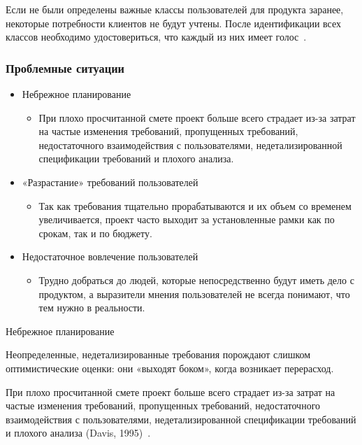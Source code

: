 \documentclass{../industrial-development}
\begin{document}
{Если не были определены важные классы пользователей для продукта заранее, некоторые потребности клиентов не будут учтены.
После идентификации всех классов необходимо удостовериться, что каждый из них имеет голос~\cite[с.~19]{Wiegers}.


\begin{frame} \frametitle {Проблемные ситуации}
\begin{itemize}

\item \alert{Небрежное планирование} 
\begin{itemize}
\item При плохо просчитанной смете проект больше всего страдает из-за затрат на частые изменения требований, пропущенных требований, недостаточного взаимодействия с пользователями, недетализированной спецификации требований и плохого
анализа.
\end{itemize}

\item \alert{«Разрастание» требований пользователей}
\begin{itemize}
\item Так как требования тщательно прорабатываются и их объем со временем увеличивается, проект часто выходит за установленные рамки как по срокам, так и по бюджету. 
\end{itemize}

\item \alert{Недостаточное вовлечение пользователей}
\begin{itemize}
\item  Трудно добраться до
людей, которые непосредственно будут иметь дело с продуктом, а выразители мнения пользователей не всегда понимают, что тем нужно в реальности. 
\end{itemize}

\end{itemize}
\end{frame}

\lecturenotes


\alert{Небрежное планирование}

Неопределенные, недетализированные требования порождают слишком оптимистические оценки: они «выходят боком», когда возникает перерасход.

При плохо просчитанной смете проект больше всего страдает из-за затрат на частые изменения требований, пропущенных требований, недостаточного взаимодействия с пользователями, недетализированной спецификации требований и плохого
анализа (Davis, 1995)~\cite[с.~20]{Wiegers}.

}
\end{document}
